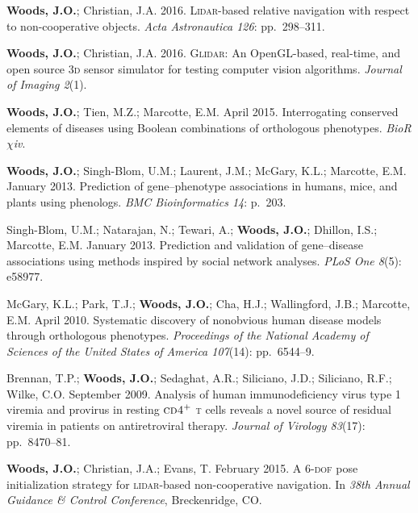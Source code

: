 \documentclass[12pt,letterpaper]{article}
\newcommand{\mhead}[1]{\leavevmode\marginpar{\sffamily\footnotesize #1}}
\begin{document}
\bigskip
\mhead{Articles}%
\par\vspace{-\baselineskip}%
\par\textbf{Woods, J.O.}; Christian, J.A. 2016. \textsc{Lidar}-based relative navigation with respect to non-cooperative objects. \textit{Acta Astronautica 126}: pp.\ 298--311.

\medskip
\par\textbf{Woods, J.O.}; Christian, J.A. 2016. \textsc{Glidar}: An OpenGL-based, real-time, and open source 3\textsc{d} sensor simulator for testing computer vision algorithms. \textit{Journal of Imaging 2}(1).

\medskip
\par\textbf{Woods, J.O.}; Tien, M.Z.; Marcotte, E.M. April 2015. Interrogating conserved elements of diseases using Boolean combinations of orthologous phenotypes. \textit{BioR$\chi$iv}.

\medskip
\par\textbf{Woods, J.O.}; Singh-Blom, U.M.; Laurent, J.M.; McGary, K.L.; Marcotte, E.M. January 2013. Prediction of gene--phenotype associations in humans, mice, and plants using phenologs. \textit{BMC Bioinformatics 14}: p.\ 203.

\medskip
\par Singh-Blom, U.M.; Natarajan, N.; Tewari, A.; \textbf{Woods, J.O.}; Dhillon, I.S.; Marcotte, E.M. January 2013. Prediction and validation of gene--disease associations using methods inspired by social network analyses. \textit{PLoS One 8}(5): e58977.

\medskip
\par McGary, K.L.; Park, T.J.; \textbf{Woods, J.O.}; Cha, H.J.; Wallingford, J.B.; Marcotte, E.M. April 2010. Systematic discovery of nonobvious human disease models through orthologous phenotypes. \textit{Proceedings of the National Academy of Sciences of the United States of America 107}(14): pp.\ 6544--9.

\medskip
\par Brennan, T.P.; \textbf{Woods, J.O.}; Sedaghat, A.R.; Siliciano, J.D.; Siliciano, R.F.; Wilke, C.O. September 2009. Analysis of human immunodeficiency virus type 1 viremia and provirus in resting $\textsc{cd4}^{+}$ \textsc{t} cells reveals a novel source of residual viremia in patients on antiretroviral therapy. \textit{Journal of Virology 83}(17): pp.\ 8470--81.

\bigskip
\mhead{Conference \newline Proceedings}%
\par\vspace{-\baselineskip}\textbf{Woods, J.O.}; Christian, J.A.; Evans, T. February 2015. A \textsc{6-dof} pose initialization strategy for \textsc{lidar}-based non-cooperative navigation. In \textit{38th Annual Guidance \& Control Conference}, Breckenridge, CO.
\end{document}
